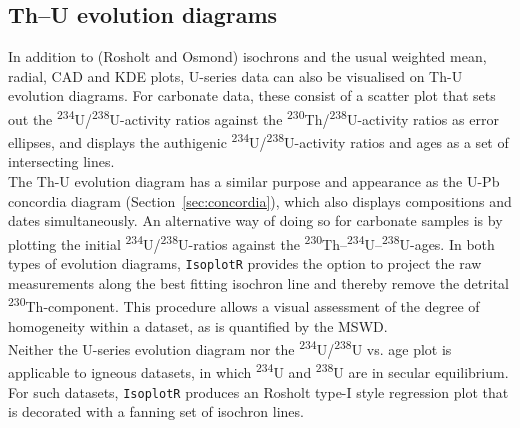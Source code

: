 \begin{refsection}
\section{Th--U evolution diagrams}\label{sec:ThUevolution}

In addition to (Rosholt and Osmond) isochrons and the usual weighted
mean, radial, CAD and KDE plots, U-series data can also be visualised
on Th-U evolution diagrams.  For carbonate data, these consist of a
scatter plot that sets out the
\textsuperscript{234}U/\textsuperscript{238}U-activity ratios against
the \textsuperscript{230}Th/\textsuperscript{238}U-activity ratios as
error ellipses, and displays the authigenic
\textsuperscript{234}U/\textsuperscript{238}U-activity ratios and ages
as a set of intersecting lines.\\

The Th-U evolution diagram has a similar purpose and appearance as the
U-Pb concordia diagram (Section~\ref{sec:concordia}), which also
displays compositions and dates simultaneously. An alternative way of
doing so for carbonate samples is by plotting the initial
\textsuperscript{234}U/\textsuperscript{238}U-ratios against the
\textsuperscript{230}Th--\textsuperscript{234}U--\textsuperscript{238}U-ages.
In both types of evolution diagrams, \texttt{IsoplotR} provides the
option to project the raw measurements along the best fitting isochron
line and thereby remove the detrital
\textsuperscript{230}Th-component. This procedure allows a visual
assessment of the degree of homogeneity within a dataset, as is
quantified by the MSWD.\\

Neither the U-series evolution diagram nor the
\textsuperscript{234}U/\textsuperscript{238}U vs. age plot is
applicable to igneous datasets, in which \textsuperscript{234}U and
\textsuperscript{238}U are in secular equilibrium.  For such datasets,
\texttt{IsoplotR} produces an Rosholt type-I style regression plot
that is decorated with a fanning set of isochron lines.


\end{refsection}

